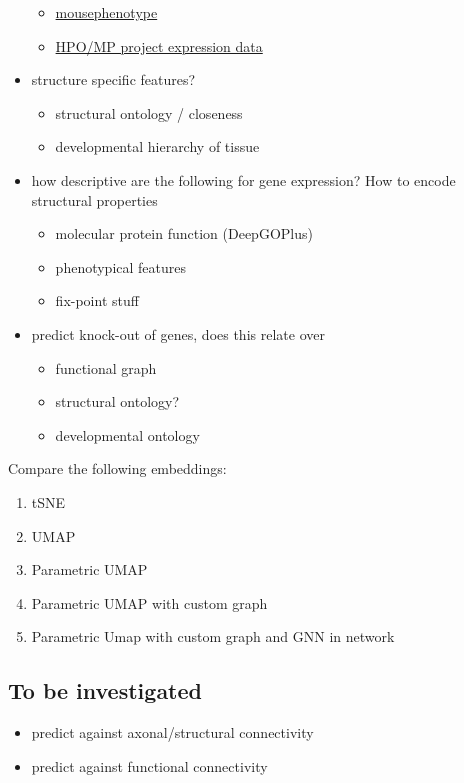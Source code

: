 \documentclass[]{article}
\renewcommand{\cite}{\citep}
\begin{document}
\begin{itemize}
\begin{itemize}
		\item \href{https://www.mousephenotype.org/}{mousephenotype}
		
		\item \href{http://www.informatics.jax.org/expression.shtml}{HPO/MP project expression data}
	\end{itemize}
	\item structure specific features?
	\begin{itemize}
		\item structural ontology / closeness
		\item developmental hierarchy of tissue
	\end{itemize}
	\item how descriptive are the following for gene expression? How to encode structural properties
	\begin{itemize}
		\item molecular protein function (DeepGOPlus)
		\item phenotypical features
		\item fix-point stuff
	\end{itemize}
	\item predict knock-out of genes, does this relate over 
	\begin{itemize}
		\item functional graph \cite{ValkShapingBrainStructure2020}
		\item structural ontology?
		\item developmental ontology
	\end{itemize}
\end{itemize}

Compare the following embeddings:
\begin{enumerate}
	\item tSNE
	\item UMAP
	\item Parametric UMAP
	\item Parametric UMAP with custom graph
	\item Parametric Umap with custom graph and GNN in network
\end{enumerate}



\subsection*{To be investigated}
\begin{itemize}
	\item predict against axonal/structural connectivity
	\item predict against functional connectivity
\end{itemize}
\end{document}
